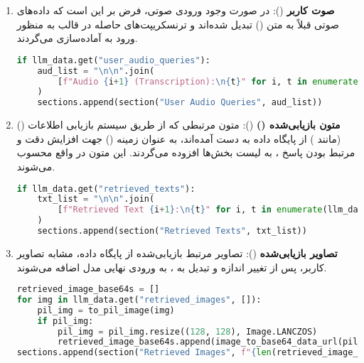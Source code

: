 \documentclass{article}
\begin{document}
\begin{enumerate}
    \item \textbf{صوت کاربر} ():
    در صورت وجود ورودی صوتی، فرض بر این است که داده‌های صوتی قبلاً به متن () تبدیل شده‌اند و ترنسکریپت‌های حاصله در قالب  به منظور ورود به  آماده‌سازی می‌گردند.
    
    \begin{latin}
    \begin{lstlisting}[language=Python]
if llm_data.get("user_audio_queries"):
    aud_list = "\n\n".join(
        [f"Audio {i+1} (Transcription):\n{t}" for i, t in enumerate(llm_data["user_audio_queries"])]
    )
    sections.append(section("User Audio Queries", aud_list))
    \end{lstlisting}
    \end{latin}
    
    \item \textbf{متون بازیابی‌شده ()} ():
    متون مرتبطی که از طریق سیستم بازیابی اطلاعات () (مانند ) از پایگاه داده به دست آمده‌اند، به عنوان زمینه () جهت افزایش دقت و مرتبط بودن پاسخ ، به لیست بخش‌ها افزوده می‌گردند. این متون در واقع  محسوب می‌شوند.
    
    \begin{latin}
    \begin{lstlisting}[language=Python]
if llm_data.get("retrieved_texts"):
    txt_list = "\n\n".join(
        [f"Retrieved Text {i+1}:\n{t}" for i, t in enumerate(llm_data["retrieved_texts"])]
    )
    sections.append(section("Retrieved Texts", txt_list))
    \end{lstlisting}
    \end{latin}

    \item \textbf{تصاویر بازیابی‌شده} ():
    تصاویر مرتبط بازیابی‌شده از پایگاه داده، مشابه تصاویر کاربر، پس از تغییر اندازه و تبدیل به ، به ورودی نهایی مدل اضافه می‌شوند.
    
    \begin{latin}
    \begin{lstlisting}[language=Python]
retrieved_image_base64s = []
for img in llm_data.get("retrieved_images", []):
    pil_img = to_pil_image(img)
    if pil_img:
        pil_img = pil_img.resize((128, 128), Image.LANCZOS)
        retrieved_image_base64s.append(image_to_base64_data_url(pil_img))
sections.append(section("Retrieved Images", f"{len(retrieved_image_base64s)} image(s) attached." if retrieved_image_base64s else "<no usable retrieved images>"))
    \end{lstlisting}
    \end{latin}


\end{enumerate}
\end{document}
